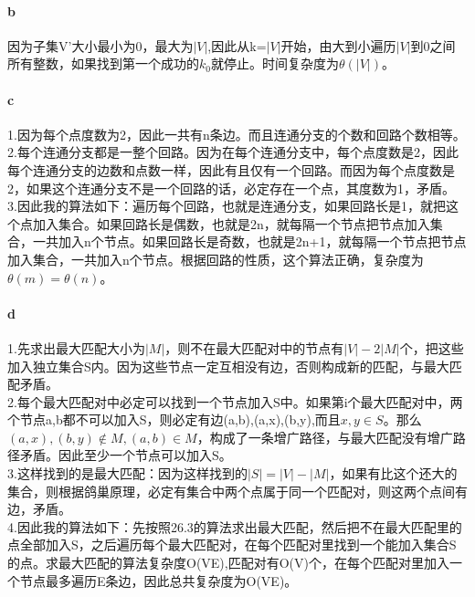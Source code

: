 \documentclass{article}
\begin{document}
\begin{CJK}{UTF8}{gkai}
\paragraph{b}
因为子集V'大小最小为0，最大为$|V|$,因此从k=$|V|$开始，由大到小遍历$|V|$到0之间所有整数，如果找到第一个成功的$k_{0}$就停止。时间复杂度为$\theta(|V|)$。\\
\paragraph{c}
1.因为每个点度数为2，因此一共有n条边。而且连通分支的个数和回路个数相等。\\
2.每个连通分支都是一整个回路。因为在每个连通分支中，每个点度数是2，因此每个连通分支的边数和点数一样，因此有且仅有一个回路。而因为每个点度数是2，如果这个连通分支不是一个回路的话，必定存在一个点，其度数为1，矛盾。\\
3.因此我的算法如下：遍历每个回路，也就是连通分支，如果回路长是1，就把这个点加入集合。如果回路长是偶数，也就是2n，就每隔一个节点把节点加入集合，一共加入n个节点。如果回路长是奇数，也就是2n+1，就每隔一个节点把节点加入集合，一共加入n个节点。根据回路的性质，这个算法正确，复杂度为$\theta(m)=\theta(n)$。\\
\paragraph{d}
1.先求出最大匹配大小为$|M|$，则不在最大匹配对中的节点有$|V|-2|M|$个，把这些加入独立集合S内。因为这些节点一定互相没有边，否则构成新的匹配，与最大匹配矛盾。\\
2.每个最大匹配对中必定可以找到一个节点加入S中。如果第i个最大匹配对中，两个节点a,b都不可以加入S，则必定有边(a,b),(a,x),(b,y),而且$x,y\in S$。那么$(a,x),(b,y)\notin M,(a,b)\in M$，构成了一条增广路径，与最大匹配没有增广路径矛盾。因此至少一个节点可以加入S。\\
3.这样找到的是最大匹配：因为这样找到的$|S|=|V|-|M|$，如果有比这个还大的集合，则根据鸽巢原理，必定有集合中两个点属于同一个匹配对，则这两个点间有边，矛盾。\\
4.因此我的算法如下：先按照26.3的算法求出最大匹配，然后把不在最大匹配里的点全部加入S，之后遍历每个最大匹配对，在每个匹配对里找到一个能加入集合S的点。求最大匹配的算法复杂度O(VE),匹配对有O(V)个，在每个匹配对里加入一个节点最多遍历E条边，因此总共复杂度为O(VE)。

\end{CJK}
\end{document}
